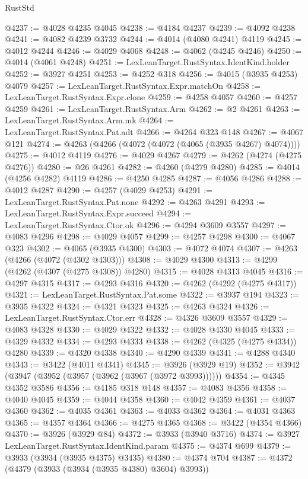 \begin{lexlean}{RustStd}
\begin{coremodule}
@4237 := @4028 @4235 @4045
@4238 := @4184 @4237
@4239 := @4092 @4238
@4241 := @4082 @4239 @3732
@4244 := @4014 (@4080 @4241) @4119
@4245 := @4012 @4244
@4246 := @4029 @4068
@4248 := @4062 (@4245 @4246)
@4250 := @4014 (@4061 @4248)
@4251 := LexLeanTarget.RustSyntax.IdentKind.holder
@4252 := @3927 @4251
@4253 := @4252 @318
@4256 := @4015 (@3935 @4253) @4079
@4257 := LexLeanTarget.RustSyntax.Expr.matchOn
@4258 := LexLeanTarget.RustSyntax.Expr.clone
@4259 := @4258 @4057
@4260 := @4257 @4259
@4261 := LexLeanTarget.RustSyntax.Arm
@4262 := @2 @4261
@4263 := LexLeanTarget.RustSyntax.Arm.mk
@4264 := LexLeanTarget.RustSyntax.Pat.adt
@4266 := @4264 @323 @148
@4267 := @4067 @121
@4274 := @4263 (@4266 (@4072 (@4072 (@4065 (@3935 @4267) @4074))))
@4275 := @4012 @4119
@4276 := @4029 @4267
@4279 := @4262 (@4274 (@4275 @4276))
@4280 := @26 @4261
@4282 := @4260 (@4279 @4280)
@4285 := @4014 (@4256 @4282) @4119
@4286 := @4250 @4285
@4287 := @4056 @4286
@4288 := @4012 @4287
@4290 := @4257 (@4029 @4253)
@4291 := LexLeanTarget.RustSyntax.Pat.none
@4292 := @4263 @4291
@4293 := LexLeanTarget.RustSyntax.Expr.succeed
@4294 := LexLeanTarget.RustSyntax.Ctor.ok
@4296 := @4294 @3609 @3557
@4297 := @4083 @4296
@4298 := @4029 @4057
@4299 := @4257 @4298
@4300 := @4067 @323
@4302 := @4065 (@3935 @4300)
@4303 := @4072 @4074
@4307 := @4263 (@4266 (@4072 (@4302 @4303)))
@4308 := @4029 @4300
@4313 := @4299 (@4262 (@4307 (@4275 @4308)) @4280)
@4315 := @4028 @4313 @4045
@4316 := @4297 @4315
@4317 := @4293 @4316
@4320 := @4262 (@4292 (@4275 @4317))
@4321 := LexLeanTarget.RustSyntax.Pat.some
@4322 := @3937 @194
@4323 := @3935 @4322
@4324 := @4321 @4323
@4325 := @4263 @4324
@4326 := LexLeanTarget.RustSyntax.Ctor.err
@4328 := @4326 @3609 @3557
@4329 := @4083 @4328
@4330 := @4029 @4322
@4332 := @4028 @4330 @4045
@4333 := @4329 @4332
@4334 := @4293 @4333
@4338 := @4262 (@4325 (@4275 @4334)) @4280
@4339 := @4320 @4338
@4340 := @4290 @4339
@4341 := @4288 @4340
@4343 := @3422 (@4011 @4341)
@4345 := @3926 (@3929 @19)
@4352 := @3942 (@3947 (@3952 (@3957 (@3962 (@3967 (@3972 @3993))))))
@4354 := @4345 @4352 @3586
@4356 := @4185 @318 @148
@4357 := @4083 @4356
@4358 := @4040 @4045
@4359 := @4044 @4358
@4360 := @4042 @4359
@4361 := @4037 @4360
@4362 := @4035 @4361
@4363 := @4033 @4362
@4364 := @4031 @4363
@4365 := @4357 @4364
@4366 := @4275 @4365
@4368 := @3422 (@4354 @4366)
@4370 := @3926 (@3929 @84)
@4372 := @3933 (@3940 @3716)
@4374 := @3927 LexLeanTarget.RustSyntax.IdentKind.param
@4375 := @4374 @699
@4379 := @3933 (@3934 (@3935 @4375) @3435)
@4380 := @4374 @704
@4387 := @4372 (@4379 (@3933 (@3934 (@3935 @4380) @3604) @3993))

\end{coremodule}
\end{lexlean}
